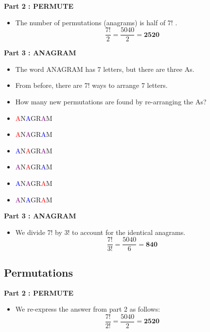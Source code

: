 \documentclass[12pt]{report}
\begin{document}
		\textbf{Part 2 : PERMUTE}\\
		\begin{itemize}
			\item The number of permutations (anagrams) is half of 7! .
			\LARGE
			\[\frac{7!}{2} =  \frac{5040}{2} = \boldsymbol{2520} \]
		\end{itemize}
		
		
		\textbf{Part 3 : ANAGRAM}\\
		\begin{itemize}
			\item The word ANAGRAM has 7 letters, but there are three As.
			\item From before, there are 7! ways to arrange 7 letters.
			\item How many new permutations are found by re-arranging the As?
		\end{itemize}
		\LARGE
		\begin{itemize}
		\item	\textcolor{red}{A}N\textcolor{blue}{A}GR\textcolor{purple}{A}M 
	\item		\textcolor{red}{A}N\textcolor{purple}{A}GR\textcolor{blue}{A}M 
	\item 		\textcolor{blue}{A}N\textcolor{red}{A}GR\textcolor{purple}{A}M  \\
	\item		\textcolor{purple}{A}N\textcolor{red}{A}GR\textcolor{blue}{A}M 
		\item	\textcolor{blue}{A}N\textcolor{purple}{A}GR\textcolor{red}{A}M 
	\item		\textcolor{purple}{A}N\textcolor{blue}{A}GR\textcolor{red}{A}M 
		\end{itemize}

		\vspace{-0.1cm}
		\textbf{Part 3 : ANAGRAM}\\
		\begin{itemize}
			\item We divide 7! by 3! to account for the identical anagrams.
			\LARGE
			\[\frac{7!}{3!} =  \frac{5040}{6} = \boldsymbol{840} \]
		\end{itemize}
		
		
		\subsection{Permutations}
		\Large
		\vspace{-2.3cm}
		\textbf{Part 2 : PERMUTE}\\
		\begin{itemize}
			\item We re-express the answer from part 2 as follows:
			\LARGE
			\[\frac{7!}{2!} =  \frac{5040}{2} = \boldsymbol{2520} \]
		\end{itemize}
		
\end{document}
